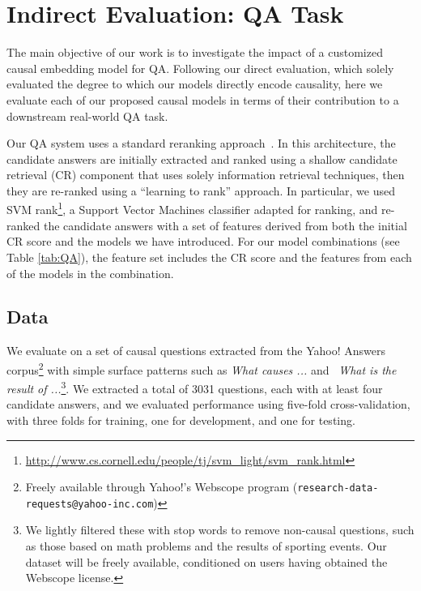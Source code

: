 \vspace{-1mm}
\section{Indirect Evaluation: QA Task}
\vspace{-1mm}
\label{sec:indirecteval}

The main objective of our work is to investigate the impact of a customized causal embedding model for QA. Following our direct evaluation, which solely evaluated the degree to which our models directly encode causality, here we evaluate each of our proposed causal models in terms of their contribution to a downstream real-world QA task.

Our QA system uses a standard reranking approach~\cite{jansen14}.
In this architecture, the candidate answers are initially extracted and ranked using a shallow candidate retrieval (CR) component that uses solely information retrieval techniques, then they are re-ranked using a ``learning to rank'' approach.
In particular, we used SVM rank\footnote{ \url{http://www.cs.cornell.edu/people/tj/svm_light/svm_rank.html}}, a Support Vector Machines classifier adapted for ranking, and re-ranked the candidate answers with a set of features derived from both the initial CR score and the models we have introduced. For our model combinations (see Table \ref{tab:QA}), the feature set includes the CR score and the features from each of the models in the combination.
%

\subsection{Data}

We evaluate on a set of causal questions extracted from the Yahoo! Answers corpus\footnote{Freely available through Yahoo!'s Webscope
program ({\scriptsize {\tt research-data-requests@yahoo-inc.com}})} with simple surface patterns such as \emph{What causes ...} and ~\emph{What is the result of ...}\footnote{We lightly filtered these with stop words to remove non-causal questions, such as those based on math problems and the results of sporting events. Our dataset will be freely available, conditioned on users having obtained the Webscope license.}.
We extracted a total of 3031 questions, each with at least four candidate answers, and we evaluated performance using five-fold cross-validation, with three folds for training, one for development, and one for testing. 


